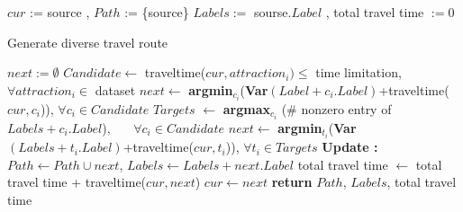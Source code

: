 \documentclass[a4paper]{extarticle}
\begin{document}
\begin{algorithm}
\renewcommand{\thealgorithm}{}
\begin{algorithmic}
\State $cur$ := source , $Path$ := \{source\}
\State $Labels := $ sourse.$Label$ , total travel time $:= 0$
\caption{Generate diverse travel route}

\State $next := \emptyset$
\State $Candidate \gets$ traveltime($cur, attraction_i) \leq$ time limitation,
\State \qquad \qquad \qquad \ $ \forall attraction_i \in$ dataset 
\State
{}
\State $next \gets$ \textbf{argmin}$_{c_i}$(\textbf{Var}$(Label+c_i.Label)$+traveltime($cur, c_i$)),
\State \qquad \qquad $\forall c_i \in Candidate$
\Else{}
\State $Targets$ $\gets$ \textbf{argmax}$_{c_i}$ (\# nonzero entry of $Labels+ c_i.Label$),
\State \qquad \qquad \ \ \ $\forall c_i \in Candidate$
\State $next \gets$ \textbf{argmin}$_{t_i}$(\textbf{Var}$(Labels+t_i.Label)$+traveltime($cur, t_i$)),
\State \qquad \qquad  $\forall t_i \in Targets$
\EndIf
\State 
\State \textbf{Update :} 
\State \quad $Path \gets Path \cup next$, $Labels \gets Labels+next.Label$
\State \quad total travel time $\gets$ total travel time + traveltime($cur, next$) 
\State \quad $cur \gets next$
\EndWhile
\State \textbf{return} $Path$, $Labels$, total travel time
\end{algorithmic}
\end{algorithm}
\end{document}
